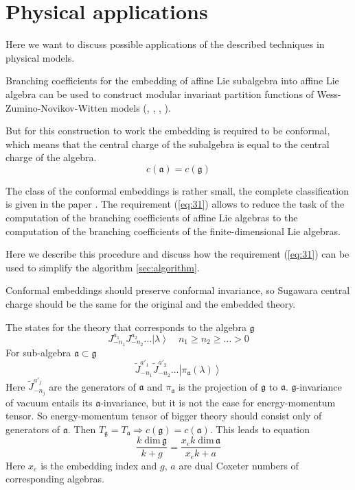 \documentclass[a4paper,12pt]{article}
\theoremstyle{definition} \newtheorem{Def}{Definition}
\begin{document}
\section{Physical applications}
\label{sec:phys-appl}
Here we want to discuss possible applications of the described techniques in physical models.

Branching coefficients for the embedding of affine Lie subalgebra into
affine Lie algebra can be used to construct modular invariant
partition functions of Wess-Zumino-Novikov-Witten models (\cite{difrancesco1997cft}, \cite{Walton:1999xc}, \cite{walton1989conformal}, \cite{schellekens1986conformal}).

But for this construction to work the embedding is required to be conformal, which means that the central charge of the subalgebra is equal to the central charge of the algebra.
\begin{equation}
  \label{eq:31}
  c(\mathfrak{a})=c(\mathfrak{g})
\end{equation}

 The class of the conformal embeddings is rather small, the complete classification is given in the paper \cite{schellekens1986conformal}.
The requirement (\ref{eq:31}) allows to reduce the task of the computation of the branching coefficients of affine Lie algebras to the computation of the branching coefficients of the finite-dimensional Lie algebras.

Here we describe this procedure and discuss how the requirement (\ref{eq:31}) can be used to simplify the algorithm \ref{sec:algorithm}.

Conformal embeddings should preserve conformal invariance, so Sugawara central charge should be the same for the original and the embedded theory.

The states for the theory that corresponds to the algebra $\mathfrak{g}$
\begin{equation}
  \label{eq:109}
  J^{a_1}_{-n_1}J^{a_2}_{-n_2}\dots\left|\lambda\right>\quad n_1\geq n_2\geq\dots>0
\end{equation}
For sub-algebra $\mathfrak{a}\subset\mathfrak{g}$
\begin{equation}
  \label{eq:110}
  \tilde{J}^{a'_1}_{-n_1}\tilde{J}^{a'_2}_{-n_2}\dots\left|\pi_{\mathfrak{a}}(\lambda)\right>
\end{equation}
Here $\tilde{J}^{a'_j}_{-n_j}$ are the generators of $\mathfrak{a}$ and $\pi_{\mathfrak{a}}$ is the projection of $\mathfrak{g}$ to $\mathfrak{a}$. $\mathfrak{g}$-invariance of vacuum entails its $\mathfrak{a}$-invariance, but it is not the case for energy-momentum tensor. So energy-momentum tensor of bigger theory should consist only of generators of $\mathfrak{a}$. Then $T_{\mathfrak{g}}=T_{\mathfrak{a}}\Rightarrow c(\mathfrak{g})=c(\mathfrak{a})$. This leads to equation
\begin{equation}
  \label{eq:111}
  \frac{k\;\mathrm{dim}\,\mathfrak{g}}{k+g}=\frac{x_e k\; \mathrm{dim}\,\mathfrak{a}}{x_ek+a}
\end{equation}
Here $x_e$ is the embedding index and $g$, $a$ are dual Coxeter numbers of corresponding algebras.
\end{document}
